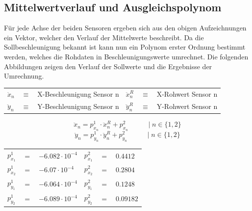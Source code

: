 \newpage
\subsection{Mittelwertverlauf und Ausgleichspolynom}
Für jede Achse der beiden Sensoren ergeben sich aus den obigen Aufzeichnungen ein Vektor, welcher den Verlauf der Mittelwerte beschreibt. Da die Sollbeschleunigung bekannt ist kann nun ein Polynom erster Ordnung bestimmt werden, welches die Rohdaten in Beschleunigungswerte umrechnet. Die folgenden Abbildungen zeigen den Verlauf der Sollwerte und die Ergebnisse der Umrechnung.


\begin{table}[h]
\centering
\begin{tabular}{lcllcl}
$\ddot{x}_n$ &$\equiv$& X-Beschleunigung Sensor n &
$\ddot{x}^R_n$ &$\equiv$& X-Rohwert Sensor n \\
$\ddot{y}_n$ &$\equiv$& Y-Beschleunigung Sensor n &
$\ddot{y}^R_n$ &$\equiv$& Y-Rohwert Sensor n
\end{tabular}
\end{table}

\vspace*{-\baselineskip}
\begin{equation}
\ddot{x}_n = p^1_{x_n} \cdot \ddot{x}^R_n + p^2_{x_n} \hspace{35pt} \vert \hspace{3pt} n \in \{1, 2\}
\end{equation}
\begin{equation}
\ddot{y}_n = p^1_{y_n} \cdot \ddot{y}^R_n + p^2_{y_n} \hspace{35pt} \vert \hspace{3pt} n \in \{1, 2\}
\end{equation}
\vspace*{-\baselineskip}
\begin{table}[h]
\centering
\begin{tabular}{lcllcl}
$p^1_{x_1}$ &$=$& $-6.082 \cdot 10^{-4}$ & $p^2_{x_1}$ &$=$& $0.4412$ \\
$p^1_{x_2}$ &$=$& $-6.07 \cdot 10^{-4}$ & $p^2_{x_2}$ &$=$& $0.2804$ \\
$p^1_{y_1}$ &$=$& $-6.064 \cdot 10^{-4}$ & $p^2_{y_1}$ &$=$& $0.1248$ \\
$p^1_{y_2}$ &$=$& $-6.089 \cdot 10^{-4}$ & $p^2_{y_2}$ &$=$& $0.09182$ \\
\end{tabular}
\end{table}

